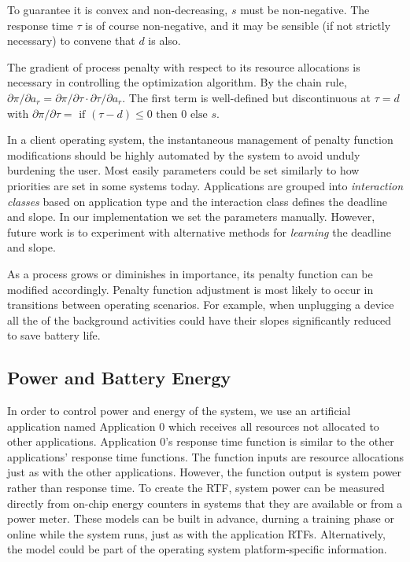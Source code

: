 To guarantee it is convex and non-decreasing, $s$ must be non-negative.
The response time $\tau$  is of course non-negative, and it may be sensible (if not strictly necessary) to convene that $d$ is also.

The gradient of process penalty with respect to its resource allocations is necessary in controlling the optimization algorithm.
By the chain rule, $\partial\pi/\partial a_r = \partial\pi/\partial\tau\cdot\partial\tau/\partial a_r$.
The first term is well-defined but discontinuous at $\tau = d$ with
$\partial\pi/\partial\tau = \mbox{ if } (\tau - d) \leq 0 \mbox{ then } 0 \mbox{ else } s$.

In a client operating system, the instantaneous management of penalty function modifications should be highly automated by the system to avoid unduly burdening the user. Most easily parameters could be set similarly to how priorities are set in some systems today. Applications are grouped into \emph{interaction classes} based on application type and the interaction class defines the deadline and slope.  In our implementation we set the parameters manually. However, future work is to experiment with alternative methods for \emph{learning} the deadline and slope.
 
As a process grows or diminishes in importance, its penalty function can be modified accordingly.  Penalty function adjustment is most likely to occur in transitions between operating scenarios.  For example, when unplugging a device all the of the background activities could have their slopes significantly reduced to save battery life.

\subsection*{Power and Battery Energy}
In order to control power and energy of the system, we use an artificial application named Application 0 which receives all resources not allocated to other applications. Application 0's response time function is similar to the other applications' response time functions.  The function inputs are resource allocations just as with the other applications.  However, the function output is system power rather than response time.   To create the RTF, system power can be measured directly from on-chip energy counters in systems that they are available or from a power meter.  These models can be built in advance, durning a training phase or online while the system runs, just as with the application RTFs.  Alternatively, the model could be part of the operating system platform-specific information. 

